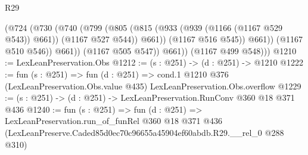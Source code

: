 \begin{lexlean}{R29}
\begin{coremodule}
                    (@724
                      (@730
                        (@740
                          (@799
                            (@805
                              (@815 (@933 (@939 (@1166 (@1167 @529 @543)) @661)) (@1167 @527 @544))
                              @661))
                          (@1167 @516 @545))
                        @661))
                    (@1167 @510 @546))
                  @661))
              (@1167 @505 @547))
            @661))
        (@1167 @499 @548)))
@1210 := LexLeanPreservation.Obs
@1212 := (s : @251) -> (d : @251) -> @1210
@1222 := fun (s : @251) =>
  fun (d : @251) =>
  cond.{1} @1210 @376 (LexLeanPreservation.Obs.value @435) LexLeanPreservation.Obs.overflow
@1229 := (s : @251) -> (d : @251) -> LexLeanPreservation.RunConv @360 @18 @371 @436
@1240 := fun (s : @251) =>
  fun (d : @251) =>
  LexLeanPreservation.run_of_funRel
    @360
    @18
    @371
    @436
    (LexLeanPreserve.Caded85d0ec70c96655a45904ef60abdb.R29.__rel_0 @288 @310)
\end{coremodule}
\end{lexlean}
